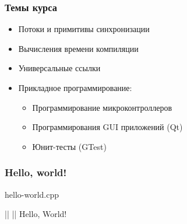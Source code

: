 \documentclass[compress]{beamer}
\begin{document}
\begin{frame}

    \frametitle{Темы курса}

    \begin{itemize}

        \item Потоки и примитивы синхронизации

        \item Вычисления времени компиляции

        \item Универсальные ссылки

        \item Прикладное программирование:

            \begin{itemize}

                \item Программирование микроконтроллеров

                \item Программирования GUI приложений (Qt)

                \item Юнит-тесты (GTest)

            \end{itemize}

    \end{itemize}

\end{frame}

\begin{frame}[fragile]

    \frametitle{Hello, world!}

        {hello-world.cpp}

    \begin{terminalwindow}[||]
||
||
Hello, World!
    \end{terminalwindow}

\end{frame}
\end{document}
